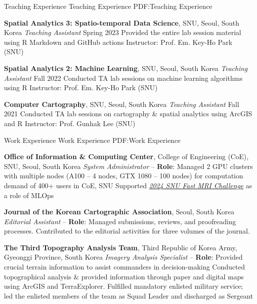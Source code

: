 \documentclass[letterpaper,MMMyyyy,nonstopmode]{simpleresumecv}
\begin{document}
\begin{Body}

\Section
{Teaching Experience}
{Teaching Experience}
{PDF:Teaching Experience}

\Entry
\textbf{Spatial Analytics 3: Spatio-temporal Data Science}, SNU, Seoul, South Korea
\Gap
\textit{      Teaching Assistant}
\hfill
Spring 2023
\Gap
\SubBulletItem
Provided the entire lab session material using R Markdown and GitHub actions
\Gap
\SubBulletItem
Instructor: Prof. Em. Key-Ho Park (SNU)

\BigGap
\Entry

\textbf{Spatial Analytics 2: Machine Learning}, SNU, Seoul, South Korea
\Gap
\textit{      Teaching Assistant}
\hfill
Fall 2022
\Gap
\SubBulletItem
Conducted TA lab sessions on machine learning algorithms using R
\Gap
\SubBulletItem
Instructor: Prof. Em. Key-Ho Park (SNU)

\BigGap
\Entry

\textbf{Computer Cartography}, SNU, Seoul, South Korea
\Gap
\textit{      Teaching Assistant}
\hfill
Fall 2021
\Gap
\SubBulletItem
Conducted TA lab sessions on cartography \& spatial analytics using ArcGIS and R
\Gap
\SubBulletItem
Instructor: Prof. Gunhak Lee (SNU)



\Section
{Work Experience}
{Work Experience}
{PDF:Work Experience}

\Entry
\textbf{Office of Information \& Computing Center}, College of Engineering (CoE), SNU, Seoul, South Korea
\Gap
\textit{       System Administrator}
\hfill
{} --
\Gap
\SubBulletItem
\textbf{Role}: Managed 2 GPU clusters with multiple nodes (A100 – 4 nodes, GTX 1080 – 100 nodes) for computation demand of 400+ users in CoE, SNU
\Gap
\SubBulletItem
Supported \textit{\href{https://fastmri.snu.ac.kr/}{2024 SNU Fast MRI Challenge}} as a role of MLOps
\BigGap


\Entry
\textbf{Journal of the Korean Cartographic Association}, Seoul, South Korea
\Gap
\textit{       Editorial Assistant}
\hfill
{} --
\Gap
\SubBulletItem
\textbf{Role}: Managed submissions, reviews, and proofreading processes.
\Gap
\SubBulletItem
Contributed to the editorial activities for three volumes of the journal.
\BigGap



\Entry
\textbf{The Third Topography Analysis Team}, Third Republic of Korea Army, Gyeonggi Province, South Korea
\Gap
\textit{      Imagery Analysis Specialist}
\hfill
{} --
\Gap
\SubBulletItem
\textbf{Role}: Provided crucial terrain information to assist commanders in decision-making
\Gap
\SubBulletItem
Conducted topographical analysis \& provided information through paper and digital maps using ArcGIS and TerraExplorer.
\Gap
\SubBulletItem
Fulfilled mandatory enlisted military service; led the enlisted members of the team as Squad Leader and discharged as Sergeant



\end{Body}
\end{document}
